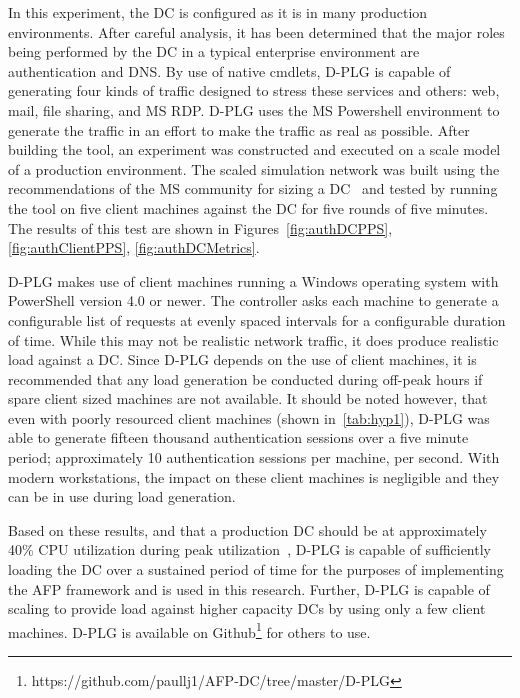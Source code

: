 In this experiment, the \ac{DC} is configured as it is in many production
environments.  After careful analysis, it has been determined that the major
roles being performed by the \ac{DC} in a typical enterprise environment are
authentication and \ac{DNS}.  By use of native cmdlets, \ac{D-PLG} is capable
of generating four kinds of traffic designed to stress these services and
others: web, mail, file sharing, and \ac{MS} \ac{RDP}.  \ac{D-PLG} uses the
\ac{MS} Powershell environment to generate the traffic in an effort to make the
traffic as real as possible.  After building the tool, an experiment was
constructed and executed on a scale model of a production environment.  The
scaled simulation network was built using the recommendations of the \ac{MS}
community for sizing a \ac{DC}~\cite{mak12} and tested by running the
tool on five client machines against the \ac{DC} for five rounds of five
minutes.  The results of this test are shown in Figures~\ref{fig:authDCPPS},
\ref{fig:authClientPPS}, \ref{fig:authDCMetrics}.

\figAuthDCPPS{4in}
\figAuthClientPPS{4in}
\figAuthDCMetrics{4in}

\ac{D-PLG} makes use of client machines running a Windows operating system with
PowerShell version 4.0 or newer.  The controller asks each machine to generate
a configurable list of requests at evenly spaced intervals for a configurable
duration of time.  While this may not be realistic network traffic, it does
produce realistic load against a \ac{DC}.  Since \ac{D-PLG} depends on the use
of client machines, it is recommended that any load generation be conducted
during off-peak hours if spare client sized machines are not available.  It
should be noted however, that even with poorly resourced client machines (shown
in~\ref{tab:hyp1}), \ac{D-PLG} was able to generate fifteen thousand
authentication sessions over a five minute period; approximately 10
authentication sessions per machine, per second.  With modern workstations, the
impact on these client machines is negligible and they can be in use during
load generation.

Based on these results, and that a production \ac{DC} should be at
approximately 40\% \ac{CPU} utilization during peak utilization~\cite{mak12},
\ac{D-PLG} is capable of sufficiently loading the \ac{DC} over a sustained
period of time for the purposes of implementing the \ac{AFP} framework and is
used in this research.  Further, \ac{D-PLG} is capable of scaling to provide
load against higher capacity \ac{DC}s by using only a few client machines.
\ac{D-PLG} is available on
Github\footnote{https://github.com/paullj1/AFP-DC/tree/master/D-PLG} for others
to use.

